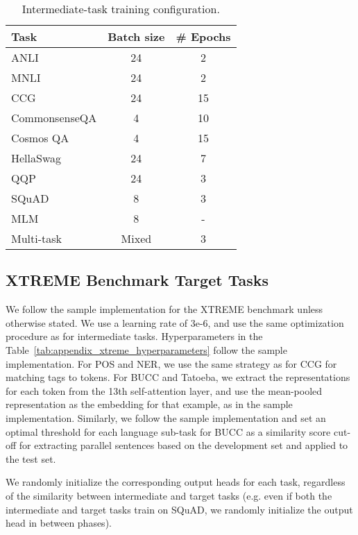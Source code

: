 \documentclass[11pt,a4paper]{article}
\newcommand{\anli}{ANLI}
\begin{document}
\begin{table}[ht!]
\centering\small
\begin{tabular}{lcc}
\toprule
Task & Batch size & \# Epochs \\
\midrule
\anli & 24 & 2 \\
MNLI & 24 & 2 \\
CCG & 24 & 15 \\
CommonsenseQA & 4 & 10 \\
Cosmos QA & 4& 15 \\
HellaSwag & 24 & 7 \\
QQP & 24 & 3 \\
SQuAD & 8 & 3 \\
MLM & 8 & -\\
Multi-task & Mixed & 3 \\
\bottomrule
\end{tabular}
\caption{Intermediate-task training configuration.}
\label{tab:appendix_intermediate_hyperparameters}
\end{table}

\subsection{XTREME Benchmark Target Tasks}

We follow the sample implementation for the XTREME benchmark unless otherwise stated. We use a learning rate of 3e-6, and use the same optimization procedure as for intermediate tasks. Hyperparameters in the Table~\ref{tab:appendix_xtreme_hyperparameters} follow the sample implementation. For POS and NER, we use the same strategy as for CCG for matching tags to tokens. For BUCC and Tatoeba, we extract the representations for each token from the 13th self-attention layer, and use the mean-pooled representation as the embedding for that example, as in the sample implementation. Similarly, we follow the sample implementation and set an optimal threshold for each language sub-task for BUCC as a similarity score cut-off for extracting parallel sentences based on the development set and applied to the test set.

We randomly initialize the corresponding output heads for each task, regardless of the similarity between intermediate and target tasks (e.g. even if both the intermediate and target tasks train on SQuAD, we randomly initialize the output head in between phases).
\end{document}
